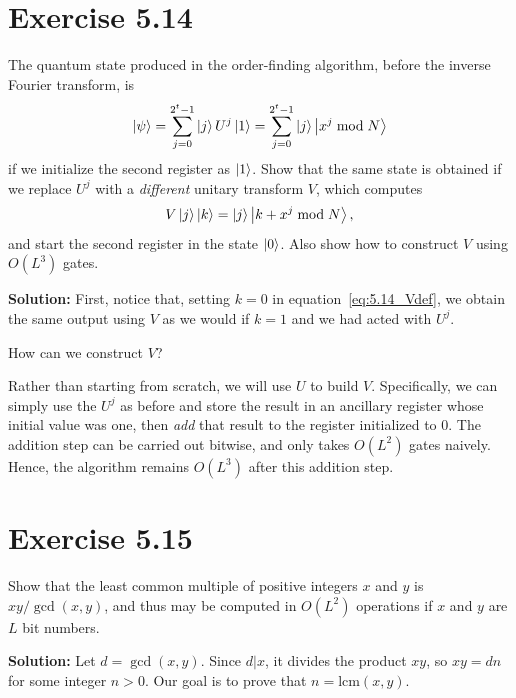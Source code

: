 \documentclass{book}
\begin{document}
\section*{Exercise 5.14}
    The quantum state produced in the order-finding algorithm, before
    the inverse Fourier transform, is
    \begin{align}
        \ket{\psi} =\sum_{j=0}^{2^t-1}\ket{j}U^j\ket{1} =\sum_{j=0}^{2^t-1}\ket{j}\ket{x^j\bmod N}
    \end{align}
    if we initialize the second register as $\ket{1}$. Show that the same state is obtained if we replace $U^j$ with a \emph{different} unitary transform $V$, which computes
    \begin{align} \label{eq:5.14_Vdef}
        V\ket{j}\ket{k} = \ket{j}\ket{k+x^j\bmod N},
    \end{align}
    and start the second register in the state $\ket{0}$. Also show how to construct $V$ using $O(L^3)$ gates.

    \textbf{Solution:} First, notice that, setting $k=0$ in equation~\eqref{eq:5.14_Vdef}, we obtain the same output using $V$ as we would if $k=1$ and we had acted with $U^j$. 
    
    How can we construct $V$? 
    
    Rather than starting from scratch, we will use $U$ to build $V$. Specifically, we can simply use the $U^j$ as before and store the result in an ancillary register whose initial value was one, then \emph{add} that result to the register initialized to 0. The addition step can be carried out bitwise, and only takes $O(L^2)$ gates naively. Hence, the algorithm remains $O(L^3)$ after this addition step.

\section*{Exercise 5.15}
    Show that the least common multiple of positive integers $x$ and $y$ is $xy/\gcd(x,y)$, and thus may be computed in $O(L^2)$ operations if $x$ and $y$ are $L$ bit numbers.
    
    \textbf{Solution:} Let $d = \gcd(x,y)$. Since $d|x$, it divides the product $xy$, so $xy = dn$ for some integer $n >0$. Our goal is to prove that $n=\text{lcm}(x,y)$.
    
\end{document}

